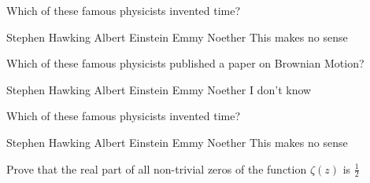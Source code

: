 \documentclass[addpoints,10pt]{exam}
\begin{document}
\begin{questions}
\begin{parts}
	\end{parts}
	\droptotalpoints

	\question Which of these famous physicists invented time?

	\begin{oneparchoices}
		\choice Stephen Hawking
		\choice Albert Einstein
		\choice Emmy Noether
		\choice This makes no sense
	\end{oneparchoices}

	\question Which of these famous physicists published a paper on Brownian Motion?

	\begin{checkboxes}
		\choice Stephen Hawking
		\choice Albert Einstein
		\choice Emmy Noether
		\choice I don't know
	\end{checkboxes}

	\question Which of these famous physicists invented time?

	\begin{choices}
		\choice Stephen Hawking
		\choice Albert Einstein
		\choice Emmy Noether
		\choice This makes no sense
	\end{choices}

	\bonusquestion[30] Prove that the real part of all non-trivial zeros of the function
	\(\zeta(z)\) is \(\frac{1}{2}\)

\end{questions}
\combinedgradetable[h]

\gradetable[v]

\bonusgradetable
\end{document}
